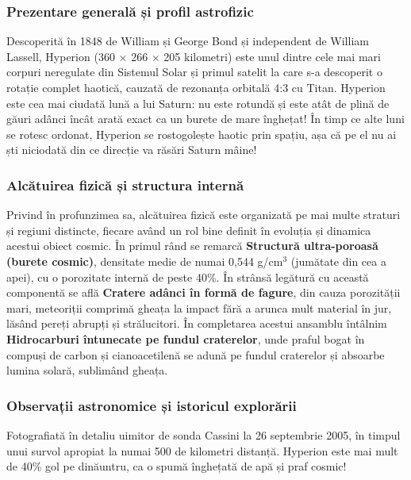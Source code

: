 \subsubsection*{Prezentare generală și profil astrofizic}
Descoperită în 1848 de William și George Bond și independent de William Lassell, Hyperion (360 $\times$ 266 $\times$ 205 kilometri) este unul dintre cele mai mari corpuri neregulate din Sistemul Solar și primul satelit la care s-a descoperit o rotație complet haotică, cauzată de rezonanța orbitală 4:3 cu Titan. Hyperion este cea mai ciudată lună a lui Saturn: nu este rotundă și este atât de plină de găuri adânci încât arată exact ca un burete de mare înghețat! În timp ce alte luni se rotesc ordonat, Hyperion se rostogolește haotic prin spațiu, așa că pe el nu ai ști niciodată din ce direcție va răsări Saturn mâine!

\subsubsection*{Alcătuirea fizică și structura internă}
Privind în profunzimea sa, alcătuirea fizică este organizată pe mai multe straturi și regiuni distincte, fiecare având un rol bine definit în evoluția și dinamica acestui obiect cosmic. În primul rând se remarcă \textbf{Structură ultra-poroasă (\guillemotleft{}burete cosmic\guillemotright{})}, densitate medie de numai 0,544 g/cm$^3$ (jumătate din cea a apei), cu o porozitate internă de peste 40\%. În strânsă legătură cu această componentă se află \textbf{Cratere adânci în formă de fagure}, din cauza porozității mari, meteoriții comprimă gheața la impact fără a arunca mult material în jur, lăsând pereți abrupți și strălucitori. În completarea acestui ansamblu întâlnim \textbf{Hidrocarburi întunecate pe fundul craterelor}, unde praful bogat în compuși de carbon și cianoacetilenă se adună pe fundul craterelor și absoarbe lumina solară, sublimând gheața.

\subsubsection*{Observații astronomice și istoricul explorării}
Fotografiată în detaliu uimitor de sonda Cassini la 26 septembrie 2005, în timpul unui survol apropiat la numai 500 de kilometri distanță. Hyperion este mai mult de 40\% gol pe dinăuntru, ca o spumă înghețată de apă și praf cosmic!

